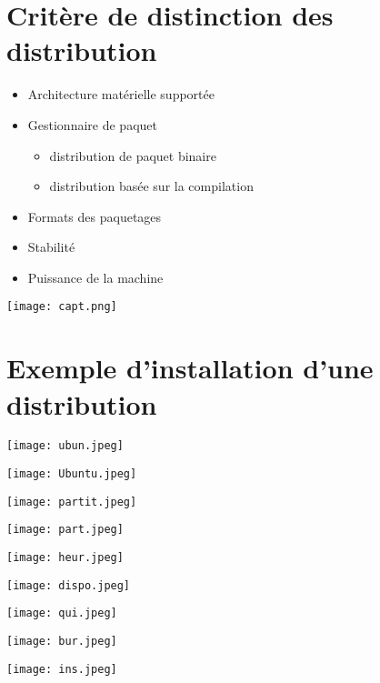 \documentclass{beamer}
\begin{document}
\section{Critère de distinction des distribution}
\begin{frame}
\begin{itemize}[<+-| alert@+>]
    \item Architecture matérielle supportée
    \item Gestionnaire de paquet
    \begin{itemize}[<+-| alert@+>]
    \item distribution de paquet binaire
    \item distribution basée sur la compilation
    \end{itemize}
    \item Formats des paquetages 
    \item Stabilité
    \item Puissance de la machine
    
\end{itemize}
\end{frame}
\begin{frame}
    \texttt{[image: capt.png]}
    \end{frame}
\section{Exemple d'installation d'une distribution}
\begin{frame}
    \texttt{[image: ubun.jpeg]}
    \end{frame}
    \begin{frame}
     \texttt{[image: Ubuntu.jpeg]}
\end{frame}
\begin{frame}
    \texttt{[image: partit.jpeg]}
    \end{frame}
    \begin{frame}
    \texttt{[image: part.jpeg]}
    \end{frame}
    \begin{frame}
    \texttt{[image: heur.jpeg]}
    \end{frame}
    \begin{frame}
    \texttt{[image: dispo.jpeg]}
    \end{frame}
    \begin{frame}
    \texttt{[image: qui.jpeg]}
    \end{frame}
    \begin{frame}
    \texttt{[image: bur.jpeg]}
    \end{frame}
    \begin{frame}
    \texttt{[image: ins.jpeg]}
    \end{frame}
\end{document}
